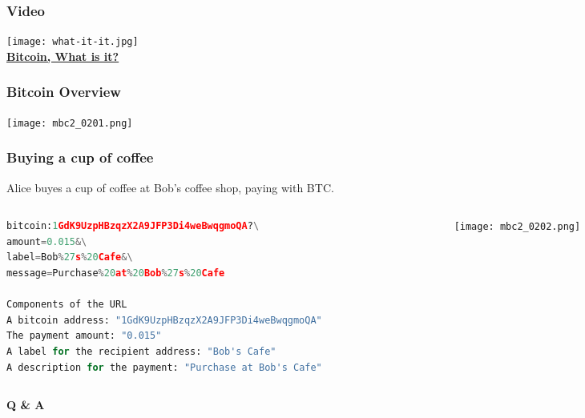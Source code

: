\begin{frame}
    \frametitle{Video}
    \begin{center}
        \texttt{[image: what-it-it.jpg]} \\
        \href{run:cryptocurrency.mp4}{\textbf{Bitcoin, What is it?}}
    \end{center}
\end{frame}

\begin{frame}
    \frametitle{Bitcoin Overview}
    \texttt{[image: mbc2\_0201.png]}
\end{frame}

\begin{frame}[fragile]
    \frametitle{Buying a cup of coffee}
    Alice buyes a cup of coffee at Bob's coffee shop, paying with BTC.
    \begin{columns}
        \begin{column}{0.6\textwidth}
            \begin{lstlisting}[language=Python]
bitcoin:1GdK9UzpHBzqzX2A9JFP3Di4weBwqgmoQA?\
amount=0.015&\
label=Bob%27s%20Cafe&\
message=Purchase%20at%20Bob%27s%20Cafe

Components of the URL
A bitcoin address: "1GdK9UzpHBzqzX2A9JFP3Di4weBwqgmoQA"
The payment amount: "0.015"
A label for the recipient address: "Bob's Cafe"
A description for the payment: "Purchase at Bob's Cafe"
            \end{lstlisting}
        \end{column}
        \begin{column}{0.3\textwidth}
            \texttt{[image: mbc2\_0202.png]}
        \end{column}
    \end{columns}
\end{frame}

\begin{frame}
    \begin{center}
        \textbf{\alert{\huge{Q \& A}}}
    \end{center}
\end{frame}

